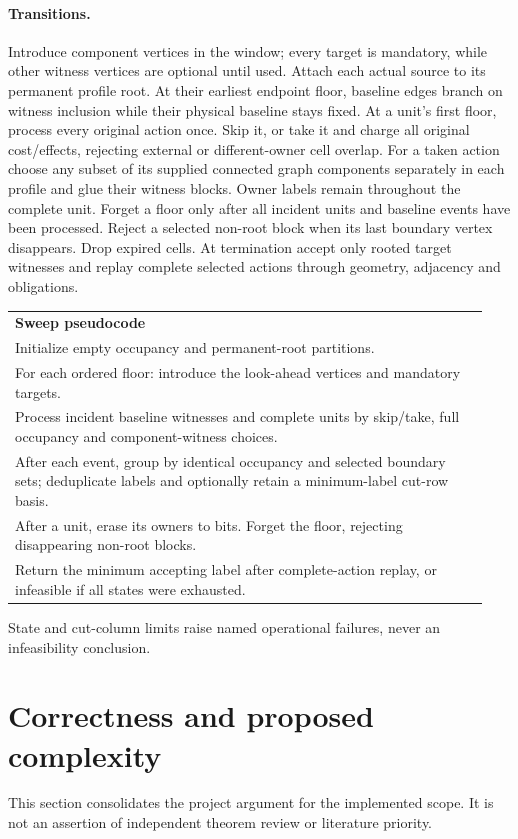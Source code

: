 \documentclass[10pt]{article}
\begin{document}
\paragraph{Transitions.}
Introduce component vertices in the window; every target is mandatory, while other witness vertices are optional until used. Attach each actual source to its permanent profile root. At their earliest endpoint floor, baseline edges branch on witness inclusion while their physical baseline stays fixed. At a unit's first floor, process every original action once. Skip it, or take it and charge all original cost/effects, rejecting external or different-owner cell overlap. For a taken action choose any subset of its supplied connected graph components separately in each profile and glue their witness blocks. Owner labels remain throughout the complete unit. Forget a floor only after all incident units and baseline events have been processed. Reject a selected non-root block when its last boundary vertex disappears. Drop expired cells. At termination accept only rooted target witnesses and replay complete selected actions through geometry, adjacency and obligations.

\begin{center}
\begin{tabular}{p{0.94\linewidth}}
\toprule
\textbf{Sweep pseudocode}\tabularnewline
Initialize empty occupancy and permanent-root partitions.\tabularnewline
For each ordered floor: introduce the look-ahead vertices and mandatory targets.\tabularnewline
Process incident baseline witnesses and complete units by skip/take, full occupancy and component-witness choices.\tabularnewline
After each event, group by identical occupancy and selected boundary sets; deduplicate labels and optionally retain a minimum-label cut-row basis.\tabularnewline
After a unit, erase its owners to bits. Forget the floor, rejecting disappearing non-root blocks.\tabularnewline
Return the minimum accepting label after complete-action replay, or infeasible if all states were exhausted.\tabularnewline
\bottomrule
\end{tabular}
\end{center}
State and cut-column limits raise named operational failures, never an infeasibility conclusion.

\section{Correctness and proposed complexity}
This section consolidates the project argument for the implemented scope. It is not an assertion of independent theorem review or literature priority.
\end{document}
